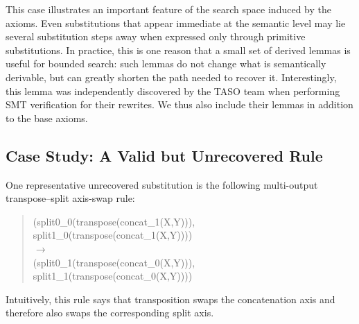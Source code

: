 \documentclass[sigplan,10pt,nonacm]{acmart}
\begin{document}
This case illustrates an important feature of the search space induced by the axioms. Even substitutions that appear immediate at the semantic level may lie several substitution steps away when expressed only through primitive substitutions. In practice, this is one reason that a small set of derived lemmas is useful for bounded search: such lemmas do not change what is semantically derivable, but can greatly shorten the path needed to recover it.
Interestingly, this lemma was independently discovered by the TASO team when performing SMT verification for their rewrites. We thus also include their lemmas in addition to the base axioms.



\subsection{Case Study: A Valid but Unrecovered Rule}

One representative unrecovered substitution is the following multi-output transpose--split axis-swap rule:
\begin{quote}
\small\ttfamily
(split0\_0(transpose(concat\_1(X,Y))),\\
\hspace*{1.5em}split1\_0(transpose(concat\_1(X,Y))))\\
$\rightarrow$\\
(split0\_1(transpose(concat\_0(X,Y))),\\
\hspace*{1.5em}split1\_1(transpose(concat\_0(X,Y))))
\end{quote}
Intuitively, this rule says that transposition swaps the concatenation axis and therefore also swaps the corresponding split axis.
\end{document}
